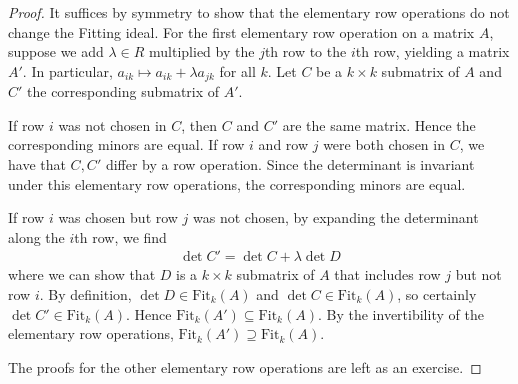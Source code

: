 \begin{proof}
	It suffices by symmetry to show that the elementary row operations do not change the Fitting ideal.
	For the first elementary row operation on a matrix $A$, suppose we add $\lambda \in R$ multiplied by the $j$th row to the $i$th row, yielding a matrix $A'$.
	In particular, $a_{ik} \mapsto a_{ik} + \lambda a_{jk}$ for all $k$.
	Let $C$ be a $k \times k$ submatrix of $A$ and $C'$ the corresponding submatrix of $A'$.

	If row $i$ was not chosen in $C$, then $C$ and $C'$ are the same matrix.
	Hence the corresponding minors are equal.
	If row $i$ and row $j$ were both chosen in $C$, we have that $C, C'$ differ by a row operation.
	Since the determinant is invariant under this elementary row operations, the corresponding minors are equal.

	If row $i$ was chosen but row $j$ was not chosen, by expanding the determinant along the $i$th row, we find
	\begin{align*}
		\det C' = \det C + \lambda \det D
	\end{align*}
	where we can show that $D$ is a $k \times k$ submatrix of $A$ that includes row $j$ but not row $i$.
	By definition, $\det D \in \mathrm{Fit}_k(A)$ and $\det C \in \mathrm{Fit}_k(A)$, so certainly $\det C' \in \mathrm{Fit}_k(A)$.
	Hence $\mathrm{Fit}_k(A') \subseteq \mathrm{Fit}_k(A)$.
	By the invertibility of the elementary row operations, $\mathrm{Fit}_k(A') \supseteq \mathrm{Fit}_k(A)$.

	The proofs for the other elementary row operations are left as an exercise.
\end{proof}

